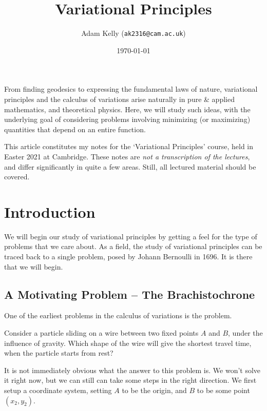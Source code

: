 \documentclass[a4paper]{scrartcl}
\title{Variational Principles}
\author{Adam Kelly (\texttt{ak2316@cam.ac.uk})}
\date{\today}
\begin{document}
\maketitle

From finding geodesics to expressing the fundamental laws of nature, variational principles and the calculus of variations arise naturally in pure \& applied mathematics, and theoretical physics.
Here, we will study such ideas, with the underlying goal of considering problems involving minimizing (or maximizing) quantities that depend on an entire function. 

This article constitutes my notes for the `Variational Principles' course, held in Easter 2021 at Cambridge. These notes are \emph{not a transcription of the lectures}, and differ significantly in quite a few areas. Still, all lectured material should be covered.


\tableofcontents

\section{Introduction}



We will begin our study of variational principles by getting a feel for the type of problems that we care about. 
As a field, the study of variational principles can be traced back to a single problem, posed by Johann Bernoulli in 1696. It is there that we will begin.

\subsection{A Motivating Problem -- The Brachistochrone}

One of the earliest problems in the calculus of variations is the  problem.

\begin{example}[Brachistochrone]
	Consider a particle sliding on a wire between two fixed points $A$ and $B$, under the influence of gravity. Which shape of the wire will give the shortest travel time, when the particle starts from rest?
\end{example}

It is not immediately obvious what the answer to this problem is. We won't solve it right now, but we can still can take some steps in the right direction. We first setup a coordinate system, setting $A$ to be the origin, and $B$ to be some point $(x_2, y_2)$.
\end{document}
